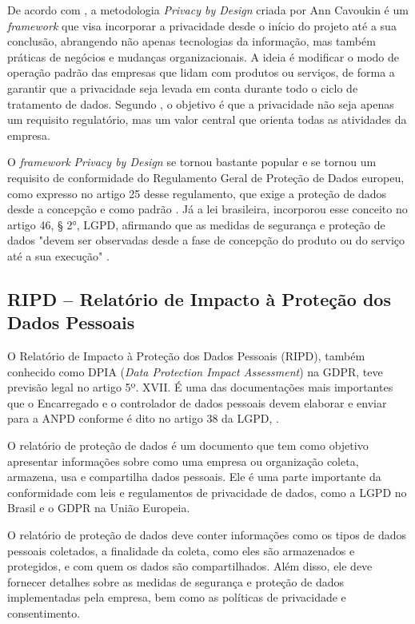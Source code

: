 \documentclass[
	12pt,				%
	openright,			%
	oneside,			%
	a4paper,			%
	english,			%
	french,				%
	spanish,			%
	brazil,				%
	]{abntex2}
\begin{document}
De acordo com , a metodologia \textit{Privacy by Design} criada por Ann Cavoukin é um \textit{framework} que visa incorporar a privacidade desde o início do projeto até a sua conclusão, abrangendo não apenas tecnologias da informação, mas também práticas de negócios e mudanças organizacionais. A ideia é modificar o modo de operação padrão das empresas que lidam com produtos ou serviços, de forma a garantir que a privacidade seja levada em conta durante todo o ciclo de tratamento de dados. Segundo , o objetivo é que a privacidade não seja apenas um requisito regulatório, mas um valor central que orienta todas as atividades da empresa.

O \textit{framework} \textit{Privacy by Design} se tornou bastante popular e se tornou um requisito de conformidade do Regulamento Geral de Proteção de Dados europeu, como expresso no artigo 25 desse regulamento, que exige a proteção de dados desde a concepção e como padrão \cite{oliveira2020}. Já a lei brasileira, incorporou esse conceito no artigo 46, § 2°, LGPD, afirmando que as medidas de segurança e proteção de dados "devem ser observadas desde a fase de concepção do produto ou do serviço até a sua execução" \cite{01-01-LeiGeral}.


\subsection{ RIPD – Relatório de Impacto à Proteção dos Dados Pessoais  }

O Relatório de Impacto à Proteção dos Dados Pessoais (RIPD), também conhecido como DPIA (\textit{Data Protection Impact Assessment}) na GDPR, teve previsão legal no artigo 5º. XVII. É uma das documentações mais importantes que o Encarregado e o controlador de dados pessoais devem elaborar e enviar para a ANPD conforme é dito no artigo 38 da LGPD, \cite{01-01-LeiGeral}.

O relatório de proteção de dados é um documento que tem como objetivo apresentar informações sobre como uma empresa ou organização coleta, armazena, usa e compartilha dados pessoais. Ele é uma parte importante da conformidade com leis e regulamentos de privacidade de dados, como a LGPD no Brasil e o GDPR na União Europeia.

O relatório de proteção de dados deve conter informações como os tipos de dados pessoais coletados, a finalidade da coleta, como eles são armazenados e protegidos, e com quem os dados são compartilhados. Além disso, ele deve fornecer detalhes sobre as medidas de segurança e proteção de dados implementadas pela empresa, bem como as políticas de privacidade e consentimento.
\end{document}
